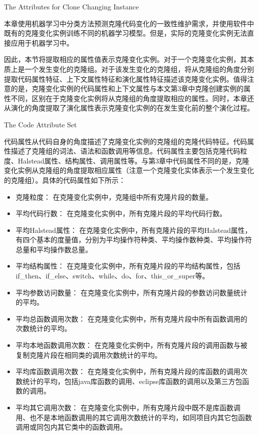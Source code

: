 {The Attributes for Clone Changing Instance}
\label{lab-changingattribute}

本章使用机器学习中分类方法预测克隆代码变化的一致性维护需求，并使用软件中既有的克隆变化实例训练不同的机器学习模型。但是，实际的克隆变化实例无法直接应用于机器学习中。

因此，本节将提取相应的属性值表示克隆变化实例。对于一个克隆变化实例，其本质上是一个发生变化的克隆组。对于该发生变化的克隆组，将从克隆组的角度分别提取代码属性特征、上下文属性特征和演化属性特征描述该克隆变化实例。值得注意的是，克隆变化实例的代码属性和上下文属性与本文第3章中克隆创建实例的属性不同，区别在于克隆变化实例将从克隆组的角度提取相应的属性。同时，本章还从演化的角度提取了演化属性表示克隆变化实例的在发生变化前的整个演化过程。

{The Code Attribute Set}

代码属性从代码自身的角度描述了克隆变化实例的克隆组的克隆代码特征。代码属性描述了克隆组的词法、语法和函数调用等信息。代码属性主要包括克隆代码粒度、Halstead属性、结构属性、调用属性等。与第3章中代码属性不同的是，克隆变化实例从克隆组的角度提取相应属性（注意一个克隆变化实体表示一个发生变化的克隆组）。具体的代码属性如下所示：

\begin{itemize}
\item 
克隆粒度：
在克隆变化实例中，克隆组中所有克隆片段的数量。
\item 
平均代码行数：
在克隆变化实例中，所有克隆片段的平均代码行数。
\item 
平均Halstead属性：
在克隆变化实例中，所有克隆片段的平均Halstead属性，有四个基本的度量值，分别为平均操作符种类、平均操作数种类、平均操作符总量和平均操作数总量。
\item
平均结构属性：
在克隆变化实例中，所有克隆片段的平均结构属性，包括{if\_then、if\_else、switch、while、do、for、this\_or\_super}等。 
\item 
平均参数访问数量：
在克隆变化实例中，所有克隆片段的参数访问数量统计的平均。
\item  
平均总函数调用次数：
在克隆变化实例中，所有克隆片段中所有函数调用的次数统计的平均。
\item  
平均本地函数调用次数：
在克隆变化实例中，所有克隆片段的调用函数与被复制克隆片段在相同类的调用次数统计的平均。
\item  
平均库函数调用次数：
在克隆变化实例中，所有克隆片段的库函数的调用次数统计的平均，包括java库函数的调用、eclipse库函数的调用以及第三方包函数的调用。
\item  
平均其它调用次数：
在克隆变化实例中，所有克隆片段中既不是库函数调用、也不是本地函数调用的其它调用次数统计的平均，如同项目内其它包函数调用或同包内其它类中的函数调用。
\end{itemize}

